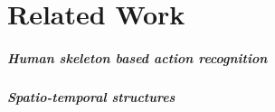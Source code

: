 
\setcounter{chapter}{1}

\chapter{Related Work}\label{chap:relatedwork}
\paragraph{Human skeleton based action recognition}
\paragraph{Spatio-temporal structures}